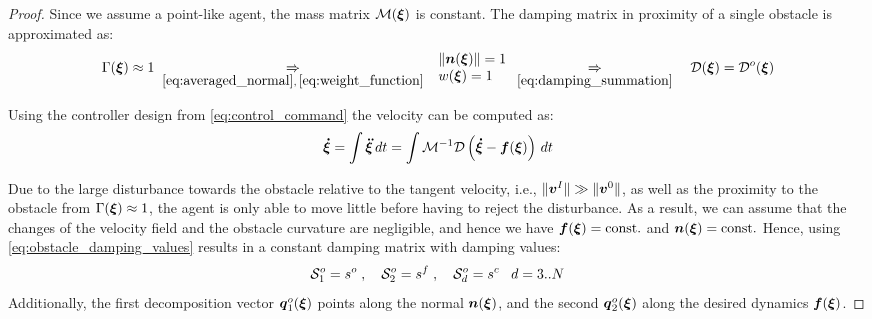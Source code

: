 \begin{proof}
Since we assume a point-like agent, the mass matrix $\mathcal{M}(\boldsymbol{\xi})$ is constant. The damping matrix in proximity of a single obstacle is approximated as:
\begin{equation}
\Gamma(\boldsymbol{\xi}) \approx 1
\; \underset{\eqref{eq:averaged_normal}, \, \eqref{eq:weight_function} } {\Rightarrow} \;
\begin{array}{l}
\| \boldsymbol{n}(\boldsymbol{\xi}) \| = 1 \\
w(\boldsymbol{\xi}) = 1
\end{array}
\underset{\eqref{eq:damping_summation}} {\Rightarrow} \quad
\mathcal{D}(\boldsymbol{\xi}) = \mathcal{D}^o(\boldsymbol{\xi})
\end{equation}

Using the controller design from \eqref{eq:control_command} the velocity can be computed as:
\begin{equation}
\begin{split}
    \vecs{\dot \xi} & = \int \vecs{\ddot \xi} \, dt 
    = \int \matd{M}^{-1} \matd{D}  \left( \vecs{\dot \xi} - \vecs f(\vecs \xi) \right) \, dt \\
\end{split}
\label{eq:velocity_evolution}
\end{equation}

Due to the large disturbance towards the obstacle relative to the tangent velocity, i.e., $\| \boldsymbol{v}^I \| \gg \| \boldsymbol{v}^0 \|$, as well as the proximity to the obstacle from $\Gamma(\boldsymbol{\xi}) \approx 1$, the agent is only able to move little before having to reject the disturbance. 
As a result, we can assume that the changes of the velocity field and the obstacle curvature are negligible, and hence we have $\boldsymbol{f}(\boldsymbol{\xi}) = \text{const.}$ and $\boldsymbol{n}(\boldsymbol{\xi}) = \text{const.}$
Hence, using \eqref{eq:obstacle_damping_values} results in a constant damping matrix with damping values:
\begin{equation}
    \mathcal{S}^o_1 = s^o
    \; , \quad
    \mathcal{S}^o_2 = s^f
    \; , \quad
    \mathcal{S}^o_d = s^c \;\;\; d = 3 .. N
\end{equation}
Additionally, the first decomposition vector $\boldsymbol{q}_1^o(\boldsymbol{\xi})$ points along the normal $\boldsymbol{n}(\boldsymbol{\xi})$, and the second $\boldsymbol{q}_2^o(\boldsymbol{\xi})$ along the desired dynamics $\boldsymbol{f}(\boldsymbol{\xi})$.


\end{proof}
